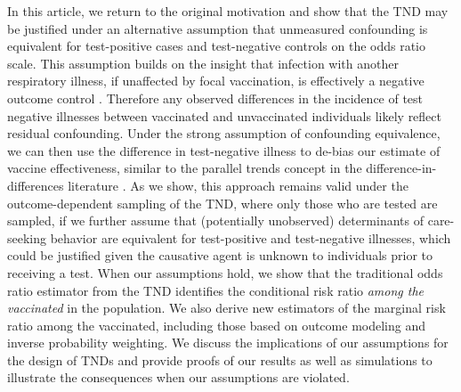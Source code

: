\documentclass[11pt]{article}
\begin{document}
In this article, we return to the original motivation and show that the TND may be justified under an alternative assumption that unmeasured confounding is equivalent for test-positive cases and test-negative controls on the odds ratio scale. This assumption builds on the insight that infection with another respiratory illness, if unaffected by focal vaccination, is effectively a negative outcome control \cite{lipsitch_negative_2010,shi_selective_2020}. Therefore any observed differences in the incidence of test negative illnesses between vaccinated and unvaccinated individuals likely reflect residual confounding. Under the strong assumption of confounding equivalence, we can then use the difference in test-negative illness to de-bias our estimate of vaccine effectiveness, similar to the parallel trends concept in the difference-in-differences literature \cite{sofer_negative_2016,park_universal_2023,tchetgen_universal_2023}. As we show, this approach remains valid under the outcome-dependent sampling of the TND, where only those who are tested are sampled, if we further assume that (potentially unobserved) determinants of care-seeking behavior are equivalent for test-positive and test-negative illnesses, which could be justified given the causative agent is unknown to individuals prior to receiving a test.  When our assumptions hold, we show that the traditional odds ratio estimator from the TND identifies the conditional risk ratio \textit{among the vaccinated} in the population. We also derive new estimators of the marginal risk ratio among the vaccinated, including those based on outcome modeling and inverse probability weighting. We discuss the implications of our assumptions for the design of TNDs and provide proofs of our results as well as simulations to illustrate the consequences when our assumptions are violated.
\end{document}
